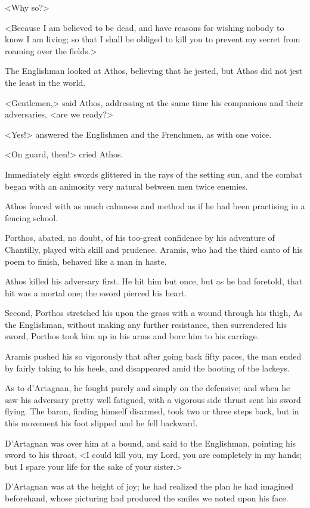 <Why so?> 

<Because I am believed to be dead, and have reasons for wishing nobody to know I am living; so that I shall be obliged to kill you to prevent my secret from roaming over the fields.> 

The Englishman looked at Athos, believing that he jested, but Athos did not jest the least in the world. 

<Gentlemen,> said Athos, addressing at the same time his companions and their adversaries, <are we ready?> 

<Yes!> answered the Englishmen and the Frenchmen, as with one voice. 

<On guard, then!> cried Athos. 

Immediately eight swords glittered in the rays of the setting sun, and the combat began with an animosity very natural between men twice enemies. 

Athos fenced with as much calmness and method as if he had been practising in a fencing school. 

Porthos, abated, no doubt, of his too-great confidence by his adventure of Chantilly, played with skill and prudence. Aramis, who had the third canto of his poem to finish, behaved like a man in haste. 

Athos killed his adversary first. He hit him but once, but as he had foretold, that hit was a mortal one; the sword pierced his heart. 

Second, Porthos stretched his upon the grass with a wound through his thigh, As the Englishman, without making any further resistance, then surrendered his sword, Porthos took him up in his arms and bore him to his carriage. 

Aramis pushed his so vigorously that after going back fifty paces, the man ended by fairly taking to his heels, and disappeared amid the hooting of the lackeys. 

As to d'Artagnan, he fought purely and simply on the defensive; and when he saw his adversary pretty well fatigued, with a vigorous side thrust sent his sword flying. The baron, finding himself disarmed, took two or three steps back, but in this movement his foot slipped and he fell backward. 

D'Artagnan was over him at a bound, and said to the Englishman, pointing his sword to his throat, <I could kill you, my Lord, you are completely in my hands; but I spare your life for the sake of your sister.> 

D'Artagnan was at the height of joy; he had realized the plan he had imagined beforehand, whose picturing had produced the smiles we noted upon his face. 

